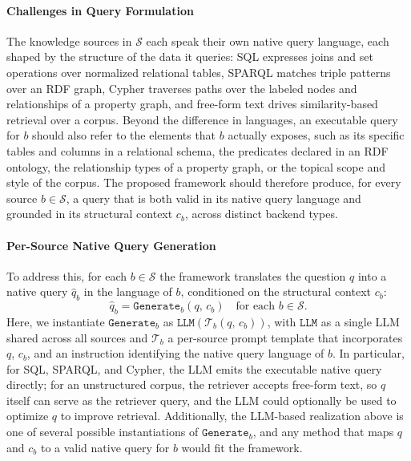 \paragraph{Challenges in Query Formulation}
The knowledge sources in $\mathcal{S}$ each speak their own native query language, each shaped by the structure of the data it queries: SQL expresses joins and set operations over normalized relational tables, SPARQL matches triple patterns over an RDF graph, Cypher traverses paths over the labeled nodes and relationships of a property graph, and free-form text drives similarity-based retrieval over a corpus. Beyond the difference in languages, an executable query for $b$ should also refer to the elements that $b$ actually exposes, such as its specific tables and columns in a relational schema, the predicates declared in an RDF ontology, the relationship types of a property graph, or the topical scope and style of the corpus. The proposed framework should therefore produce, for every source $b \in \mathcal{S}$, a query that is both valid in its native query language and grounded in its structural context $c_b$, across distinct backend types.

\paragraph{Per-Source Native Query Generation}
To address this, for each $b \in \mathcal{S}$ the framework translates the question $q$ into a native query $\hat{q}_b$ in the language of $b$, conditioned on the structural context $c_b$:
\begin{equation}
\hat{q}_b = \texttt{Generate}_b(q,\, c_b) \quad \text{for each } b \in \mathcal{S}.
\end{equation}
Here, we instantiate $\texttt{Generate}_b$ as $\texttt{LLM}(\mathcal{T}_b(q,\, c_b))$, with $\texttt{LLM}$ as a single LLM shared across all sources and $\mathcal{T}_b$ a per-source prompt template that incorporates $q$, $c_b$, and an instruction identifying the native query language of $b$. In particular, for SQL, SPARQL, and Cypher, the LLM emits the executable native query directly; for an unstructured corpus, the retriever accepts free-form text, so $q$ itself can serve as the retriever query, and the LLM could optionally be used to optimize $q$ to improve retrieval. Additionally, the LLM-based realization above is one of several possible instantiations of $\texttt{Generate}_b$, and any method that maps $q$ and $c_b$ to a valid native query for $b$ would fit the framework.

